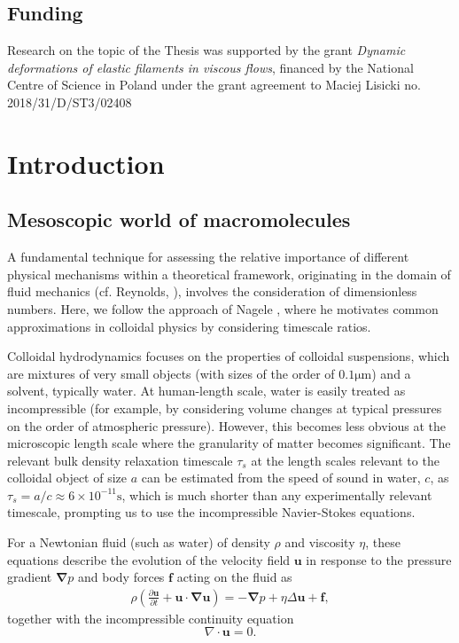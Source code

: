 \documentclass{doctoral}
\newcommand{\pd}{\partial}
\begin{document}
\vspace*{\fill}

\section*{Funding}
Research on the topic of the Thesis was supported by the grant \emph{Dynamic deformations of elastic filaments in viscous flows}, financed by the National Centre of Science in Poland under the grant agreement to Maciej Lisicki no.
2018/31/D/ST3/02408
\clearpage

\tableofcontents

\chapter{Introduction}

\section{Mesoscopic world of macromolecules}

A fundamental technique for assessing the relative importance of different physical mechanisms within a theoretical framework, originating in the domain of fluid mechanics (cf.
Reynolds, \cite{Reynolds_1883}), involves the consideration of dimensionless numbers.
Here, we follow the approach of Nagele \cite{Nagele_2013}, where he motivates common approximations in colloidal physics by considering timescale ratios.

Colloidal hydrodynamics focuses on the properties of colloidal suspensions, which are mixtures of very small objects (with sizes of the order of $0.1 \mathrm{\mu m}$) and a solvent, typically water.
At human-length scale, water is easily treated as incompressible (for example, by considering volume changes at typical pressures on the order of atmospheric pressure).
However, this becomes less obvious at the microscopic length scale where the granularity of matter becomes significant.
The relevant bulk density relaxation timescale $\tau_s$ at the length scales relevant to the colloidal object of size $a$ can be estimated from the speed of sound in water, $c$, as $\tau_s = a/c \approx 6 \times 10^{-11} \mathrm{s}$, which is much shorter than any experimentally relevant timescale, prompting us to use the incompressible Navier-Stokes equations.

For a Newtonian fluid (such as water) of density $\rho$ and viscosity $\eta$, these equations describe the evolution of the velocity field $\bm{u}$ in response to the pressure gradient $\bm{\nabla} p$ and body forces $\bm{f}$ acting on the fluid as
\begin{eqnarray}
    \rho \left( \frac{\pd \bm{u}}{\pd t} + \bm{u} \cdot \bm{\nabla u} \right) = - \bm{\nabla} p + \eta \Delta \bm{u} + \bm{f}, \label{eqn:navier-stokes-equation}
\end{eqnarray}
together with the incompressible continuity equation
\begin{equation}
    \nabla \cdot \bm{u} = 0 \label{eqn:incompressibility}.
\end{equation}
\end{document}
